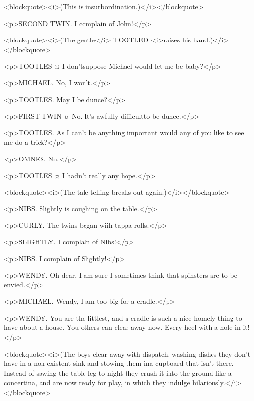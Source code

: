 <blockquote><i>(This is insurbordination.)</i></blockquote>

<p>SECOND TWIN. I complain of John!</p>

<blockquote><i>(The gentle</i> TOOTLED <i>raises his hand.)</i></blockquote>

<p>TOOTLES ¤
I don'tsuppose Michael would let me be baby?</p>

<p>MICHAEL. No, I won't.</p>

<p>TOOTLES. May I be dunce?</p>

<p>FIRST TWIN ¤
No. It's awfully difficultto be dunce.</p>

<p>TOOTLES. As I can't be anything important would any of you like to see me do a trick?</p>

<p>OMNES. No.</p>

<p>TOOTLES ¤
I hadn't really any hope.</p>

<blockquote><i>(The tale-telling breaks out again.)</i></blockquote>

<p>NIBS. Slightly is coughing on the table.</p>

<p>CURLY. The twins began wiih tappa rolls.</p>

<p>SLIGHTLY. I complain of Nibs!</p>

<p>NIBS. I complain of Slightly!</p>

<p>WENDY. Oh dear, I am sure I sometimes think that spinsters are to be envied.</p>

<p>MICHAEL. Wendy, I am too big for a cradle.</p>

<p>WENDY. You are the littlest, and a cradle is such a nice homely thing to have about a house. You others can clear away now.
Every heel with a hole in it!</p>

<blockquote><i>(The boys clear away with dispatch, washing dishes they don't have in a non-existent sink and stowing them ina cupboard that isn't there. Instead of sawing the table-leg to-night they crush it into the ground like a concertina, and are now ready for play, in which they indulge hilariously.</i></blockquote>

